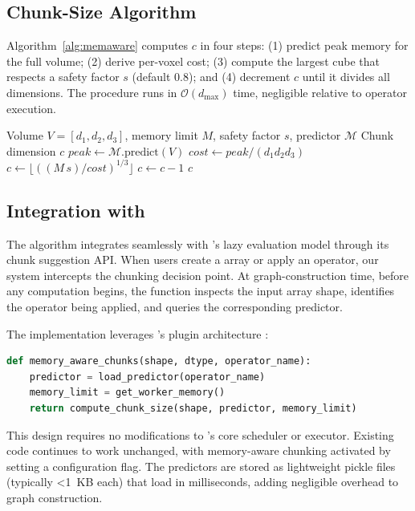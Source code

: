 \subsection{Chunk-Size Algorithm}

Algorithm~\ref{alg:memaware} computes $c$ in four steps: 
(1) predict peak memory for the full volume; 
(2) derive per-voxel cost; 
(3) compute the largest cube that respects a safety factor $s$ (default $0.8$); and 
(4) decrement $c$ until it divides all dimensions.
The procedure runs in $\mathcal{O}(d_{\max})$ time, negligible relative to operator execution.

\begin{algorithm}[tb]
\caption{Memory-aware chunk sizing}
\label{alg:memaware}
\begin{algorithmic}[1]
\REQUIRE Volume $V=[d_1,d_2,d_3]$, memory limit $M$, safety factor $s$, predictor $\mathcal{M}$
\ENSURE Chunk dimension $c$
\STATE $\textit{peak}\leftarrow\mathcal{M}.\text{predict}(V)$
\STATE $\textit{cost}\leftarrow\textit{peak}/(d_1d_2d_3)$
\STATE $c\leftarrow\lfloor ((M\,s)/\textit{cost})^{1/3}\rfloor$
    \STATE $c\leftarrow c-1$
\ENDWHILE
\RETURN $c$
\end{algorithmic}
\end{algorithm}

\subsection{Integration with \dask}

The algorithm integrates seamlessly with \dask's lazy evaluation model through its chunk suggestion \ac{API}.
When users create a \dask array or apply an operator, our system intercepts the chunking decision point.
At graph-construction time, before any computation begins, the function inspects the input array shape, identifies the operator being applied, and queries the corresponding predictor.

The implementation leverages \dask's plugin architecture :
\begin{lstlisting}[language=Python]
def memory_aware_chunks(shape, dtype, operator_name):
    predictor = load_predictor(operator_name)
    memory_limit = get_worker_memory()
    return compute_chunk_size(shape, predictor, memory_limit)
\end{lstlisting}

This design requires no modifications to \dask's core scheduler or executor.
Existing code continues to work unchanged, with memory-aware chunking activated by setting a configuration flag.
The predictors are stored as lightweight pickle files (typically \textless 1~KB each) that load in milliseconds, adding negligible overhead to graph construction.

